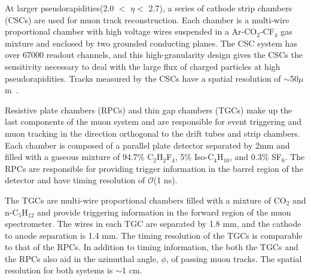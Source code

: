 At larger pseudorapidities(2.0 $<$ \textbar$\eta$\textbar $<$ 2.7), a series of cathode strip chambers (CSCs) are used for muon track reconstruction. Each chamber is a multi-wire proportional chamber with high voltage wires suspended in a Ar-CO$_2$-CF$_4$ gas mixture and enclosed by two grounded conducting planes. The CSC system has over 67000 readout channels, and this high-granularity design gives the CSCs the sensitivity necessary to deal with the large flux of charged particles at high pseudorapidities. Tracks measured by the CSCs have a spatial resolution of $\sim$50$\mu$m~\cite{muonTDR}.

Resistive plate chambers (RPCs) and thin gap chambers (TGCs) make up the last components of the muon system and are responsible for event triggering and muon tracking in the direction orthogonal to the drift tubes and strip chambers. Each chamber is composed of a parallel plate detector separated by 2mm and filled with a gaseous mixture of 94.7\% C$_2$H$_2$F$_4$, 5\% Iso-C$_4$H$_{10}$, and 0.3\% SF$_6$. The RPCs are responsible for providing trigger information in the barrel region of the detector and have timing resolution of $\mathcal{O}$(1 ns). 

The TGCs are multi-wire proportional chambers filled with a mixture of CO$_2$ and n-C$_5$H$_{12}$ and provide triggering information in the forward region of the muon spectrometer. The wires in each TGC are separated by 1.8 mm, and the cathode to anode separation is 1.4 mm. The timing resolution of the TGCs is comparable to that of the RPCs. In addition to timing information, the both the TGCs and the RPCs also aid in the azimuthal angle, $\phi$, of passing muon tracks. The spatial resolution for both systems is $\sim$1 cm.

